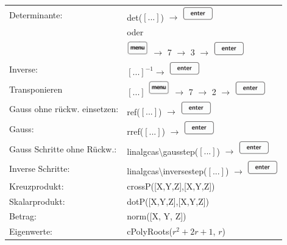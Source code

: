 \begin{tabular}{ll}
	Determinante: & det($[...]$) $\rightarrow$ \includegraphics[height=0.6cm]{pics/TR_Enter.png}\\[0.2cm]
	& oder\\[0.2cm]
	& \includegraphics[height=0.6cm]{pics/TR_Menu.png} $\rightarrow$ 7 $\rightarrow$ 3 $\rightarrow$ \includegraphics[height=0.6cm]{pics/TR_Enter.png}\\[0.2cm]
	Inverse: & $[...]^{-1} \rightarrow$ \includegraphics[height=0.6cm]{pics/TR_Enter.png}\\[0.2cm]
	Transponieren & $[...]$ \includegraphics[height=0.6cm]{pics/TR_Menu.png} $\rightarrow$ 7 $\rightarrow$ 2 $\rightarrow$ \includegraphics[height=0.6cm]{pics/TR_Enter.png}\\[0.2cm]
	Gauss ohne rückw. einsetzen: & ref($[...]$) $\rightarrow$ \includegraphics[height=0.6cm]{pics/TR_Enter.png}\\[0.2cm]
	Gauss: & rref($[...]$) $\rightarrow$ \includegraphics[height=0.6cm]{pics/TR_Enter.png}\\[0.2cm]
	Gauss Schritte ohne Rückw.\footnotemark[1]: & linalgcas\textbackslash gausstep($[...]$) $\rightarrow$ \includegraphics[height=0.6cm]{pics/TR_Enter.png}\\[0.2cm]
	Inverse Schritte\footnotemark[1]: & linalgcas\textbackslash inversestep($[...]$) $\rightarrow$ \includegraphics[height=0.6cm]{pics/TR_Enter.png}\\[0.8cm]
	
	Kreuzprodukt: & crossP([X,Y,Z],[X,Y,Z])\\[0.2cm]
	Skalarprodukt: & dotP([X,Y,Z],[X,Y,Z])\\[0.2cm]
	Betrag: & norm([X, Y, Z])\\[0.8cm]
	
	Eigenwerte: & cPolyRoots($r^2 + 2r + 1$, $r$)\\[0.2cm]

\end{tabular}
